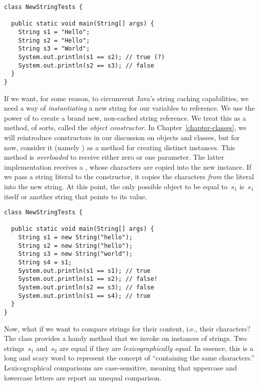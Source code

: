 \begin{lstlisting}[language=MyJava]
class NewStringTests {

  public static void main(String[] args) {
    String s1 = "Hello";
    String s2 = "Hello";
    String s3 = "World";
    System.out.println(s1 == s2); // true (?)
    System.out.println(s2 == s3); // false
  }
}
\end{lstlisting}

If we want, for some reason, to circumvent Java's string caching capabilities, we need a way of \emph{instantiating} a new string for our variables to reference. 
We use the power of  to create a brand new, non-cached string reference. 
We treat this as a method, of sorts, called the \emph{object constructor}. 
In Chapter~\ref{chapter-classes}, we will reintroduce constructors in our discussion on objects and classes, but for now, consider it (namely ) as a method for creating distinct  instances. 
This method is \emph{overloaded} to receive either zero or one parameter. 
The latter implementation receives a , whose characters are copied into the new  instance. 
If we pass a string literal to the constructor, it copies the characters \emph{from} the literal into the new string. 
At this point, the only possible object to be equal to~$s_1$ is~$s_1$ itself or another string that points to its value.

\begin{lstlisting}[language=MyJava]
class NewStringTests {

  public static void main(String[] args) {
    String s1 = new String("hello");
    String s2 = new String("hello");
    String s3 = new String("world");
    String s4 = s1;
    System.out.println(s1 == s1); // true
    System.out.println(s1 == s2); // false!
    System.out.println(s2 == s3); // false
    System.out.println(s1 == s4); // true
  }
}
\end{lstlisting}

Now, what if we want to compare strings for their content, i.e., their characters? 
The  class provides a handy  method that we invoke on instances of strings. 
Two strings~$s_1$ and~$s_2$ are equal if they are \emph{lexicographically equal}. 
In essence, this is a long and scary word to represent the concept of ``containing the same characters.'' 
Lexicographical comparisons are case-sensitive, meaning that uppercase and lowercase letters are report an unequal comparison.

